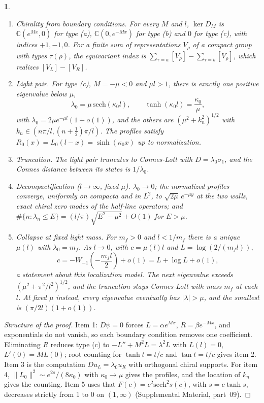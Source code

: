 \documentclass[aps,prd,reprint,onecolumn,nofootinbib,amsmath,amssymb,floatfix]{revtex4-2}
\theoremstyle{plain}
\newcommand{\resultname}{}
\newtheorem*{resultenv}{\resultname}
\newenvironment{result}[1]{\renewcommand{\resultname}{#1}\begin{resultenv}}{\end{resultenv}}
\newcommand{\supp}[1]{Supplemental Material, part~#1}
\newcommand{\C}{\mathbb C}
\begin{document}
\begin{result}{Theorem B}
\begin{enumerate}
\item \emph{Chirality from boundary conditions.} For every $M$ and $l$, $\ker D_M$ is $\C(e^{Mx},0)$ for type (a), $\C(0,e^{-Mx})$ for type (b) and $0$ for type (c), with indices $+1,-1,0$. For a finite sum of representations $V_\rho$ of a compact group with types $\tau(\rho)$, the equivariant index is $\sum_{\tau=a}[V_\rho]-\sum_{\tau=b}[V_\rho]$, which realizes $[V_L]-[V_R]$.
\item \emph{Light pair.} For type (c), $M=-\mu<0$ and $\mu l>1$, there is exactly one positive eigenvalue below $\mu$,
\begin{equation}
\lambda_0=\mu\,\mathrm{sech}(\kappa_0l),\qquad \tanh(\kappa_0l)=\frac{\kappa_0}{\mu},
\end{equation}
with $\lambda_0=2\mu e^{-\mu l}(1+o(1))$, and the others are $(\mu^2+k_n^2)^{1/2}$ with $k_n\in(n\pi/l,(n+\tfrac12)\pi/l)$. The profiles satisfy $R_0(x)=L_0(l-x)=\sinh(\kappa_0x)$ up to normalization.
\item \emph{Truncation.} The light pair truncates to Connes-Lott with $D=\lambda_0\sigma_1$, and the Connes distance between its states is $1/\lambda_0$.
\item \emph{Decompactification} ($l\to\infty$, fixed $\mu$). $\lambda_0\to0$; the normalized profiles converge, uniformly on compacta and in $L^2$, to $\sqrt{2\mu}\,e^{-\mu y}$ at the two walls, exact chiral zero modes of the half-line operators; and $\#\{n:\lambda_n\le E\}=(l/\pi)\sqrt{E^2-\mu^2}+O(1)$ for $E>\mu$.
\item \emph{Collapse at fixed light mass.} For $m_f>0$ and $l<1/m_f$ there is a unique $\mu(l)$ with $\lambda_0=m_f$. As $l\to0$, with $c=\mu(l)l$ and $L=\log(2/(m_fl))$,
\begin{equation}
c=-W_{-1}\!\left(-\frac{m_fl}{2}\right)+o(1)=L+\log L+o(1),
\end{equation}
a statement about this localization model. The next eigenvalue exceeds $(\mu^2+\pi^2/l^2)^{1/2}$, and the truncation stays Connes-Lott with mass $m_f$ at each $l$. At fixed $\mu$ instead, every eigenvalue eventually has $|\lambda|>\mu$, and the smallest is $(\pi/2l)(1+o(1))$.
\end{enumerate}
\end{result}

\begin{proof}[Structure of the proof]
Item 1: $D\psi=0$ forces $L=\alpha e^{Mx}$, $R=\beta e^{-Mx}$, and exponentials do not vanish, so each boundary condition removes one coefficient. Eliminating $R$ reduces type (c) to $-L''+M^2L=\lambda^2L$ with $L(l)=0$, $L'(0)=ML(0)$; root counting for $\tanh t=t/c$ and $\tan t=t/c$ gives item 2. Item 3 is the computation $Du_L=\lambda_0u_R$ with orthogonal chiral supports. For item 4, $\|L_0\|^2\sim e^{2s}/(8\kappa_0)$ with $\kappa_0\to\mu$ gives the profiles, and the location of $k_n$ gives the counting. Item 5 uses that $F(c)=c^2\mathrm{sech}^2s(c)$, with $s=c\tanh s$, decreases strictly from 1 to 0 on $(1,\infty)$ (\supp{09}).
\end{proof}
\end{document}
